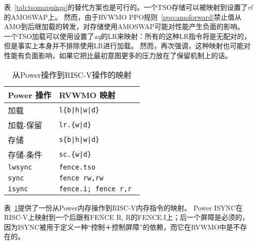 表~\ref{tab:tsomappings}的替代方案也是可行的。一个TSO存储可以被映射到设置了{\em rl}的AMOSWAP上。
然而，由于RVWMO PPO规则~\ref{ppo:amoforward}禁止值从AMO到后继加载的转发，对存储使用AMOSWAP可能对性能产生负面的影响。
一个TSO加载可以使用设置了{\em aq}的LR来映射：所有的这种LR指令将是无配对的，但是事实上本身并不排除使用LR进行加载。
然而，再次强调，这种映射也可能对性能有负面影响，如果它把比最初意图更多的压力放在了保留机制上的话。

\begin{table}[h!]
  \centering
  \begin{tabular}{|l|l|}
    \hline
    Power 操作 & RVWMO 映射 \\
    \hline
    \hline
    加载              & \tt l\{b|h|w|d\}  \\
    \hline
    加载-保留      & \tt lr.\{w|d\}  \\
    \hline
    存储             & \tt s\{b|h|w|d\}  \\
    \hline
    存储-条件 & \tt sc.\{w|d\}  \\
    \hline
    \tt lwsync        & \tt fence.tso \\
    \hline
    \tt sync          & \tt fence rw,rw \\
    \hline
    \tt isync         & \tt fence.i; fence r,r \\
    \hline
  \end{tabular}
  \caption{从Power操作到RISC-V操作的映射}
  \label{tab:powermappings}
\end{table}

表~\ref{tab:powermappings}提供了一份从Power内存操作到RISC-V内存指令的映射。
Power ISYNC在RISC-V上映射到一个后跟有FENCE R, R的FENCE.I上；后一个屏障是必须的，因为ISYNC被用于定义一种“控制＋控制屏障”的依赖，而它在RVWMO中是不存在的。

